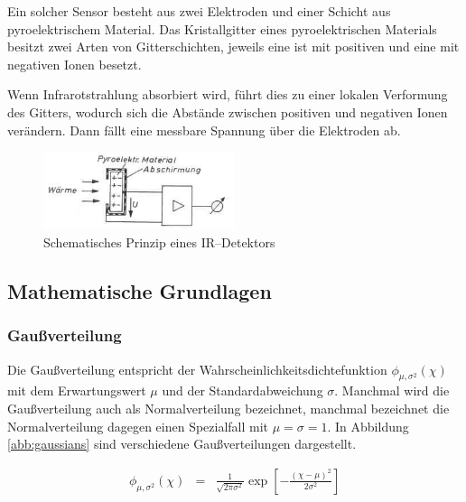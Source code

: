 \documentclass[12pt,a4paper]{scrartcl}
\numberwithin{equation}{section} %
\begin{document}
Ein solcher Sensor besteht aus zwei Elektroden und einer Schicht aus pyroelektrischem Material. Das Kristallgitter eines pyroelektrischen Materials besitzt zwei Arten von Gitterschichten, jeweils eine ist mit positiven und eine mit negativen Ionen besetzt. \cite{pyroelektrischer Sensor}

Wenn Infrarotstrahlung absorbiert wird, führt dies zu einer lokalen Verformung des Gitters, wodurch sich die Abstände zwischen positiven und negativen Ionen verändern. Dann fällt eine messbare Spannung über die Elektroden ab.

\begin{figure}[h!]
	\centering
	\includegraphics[width=0.5\textwidth]{../media/B1.1/IR_Sensor.jpg}
	\caption{Schematisches Prinzip eines IR--Detektors \cite{pyroelektrischer Sensor}}
	\label{abb:pyroelektrischer Sensor}
\end{figure}

\hypertarget{mathematische-grundlagen}{%
\subsection{Mathematische Grundlagen}\label{mathematische-grundlagen}}

\hypertarget{gauuxdfverteilung}{%
\subsubsection{Gaußverteilung}\label{gauuxdfverteilung}}

Die Gaußverteilung entspricht der Wahrscheinlichkeitsdichtefunktion $\phi_{\mu,\sigma^2}(\chi)$ mit dem Erwartungswert $\mu$ und der Standardabweichung $\sigma$. Manchmal wird die Gaußverteilung auch als Normalverteilung bezeichnet, manchmal bezeichnet die Normalverteilung dagegen einen Spezialfall mit $\mu=\sigma=1$. In Abbildung \ref{abb:gaussians} sind verschiedene Gaußverteilungen dargestellt.

\begin{eqnarray}
    \phi_{\mu,\sigma^2}(\chi) &=&
        \frac{1}{\sqrt{2\pi\sigma^2}}
        \exp\left[
            -
            \frac{(\chi - \mu)^2}{2\sigma^2}
        \right]
\end{eqnarray}
\end{document}
